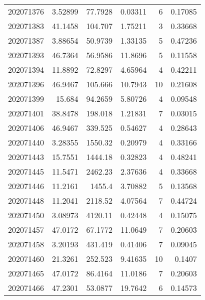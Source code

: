 \begin{tabular}{rrrrrr}
 202071376 &          3.52899 &       77.7928 &            0.03311 &           6 & 0.17085 \\
 202071383 &         41.1458  &      104.707  &            1.75211 &           3 & 0.33668 \\
 202071387 &          3.88654 &       50.9739 &            1.33135 &           5 & 0.47236 \\
 202071393 &         46.7364  &       56.9586 &           11.8696  &           5 & 0.11558 \\
 202071394 &         11.8892  &       72.8297 &            4.65964 &           4 & 0.42211 \\
 202071396 &         46.9467  &      105.666  &           10.7943  &          10 & 0.21608 \\
 202071399 &         15.684   &       94.2659 &            5.80726 &           4 & 0.09548 \\
 202071401 &         38.8478  &      198.018  &            1.21831 &           7 & 0.03015 \\
 202071406 &         46.9467  &      339.525  &            0.54627 &           4 & 0.28643 \\
 202071440 &          3.28355 &     1550.32   &            0.20979 &           4 & 0.33166 \\
 202071443 &         15.7551  &     1444.18   &            0.32823 &           4 & 0.48241 \\
 202071445 &         11.5471  &     2462.23   &            2.37636 &           4 & 0.33668 \\
 202071446 &         11.2161  &     1455.4    &            3.70882 &           5 & 0.13568 \\
 202071448 &         11.2041  &     2118.52   &            4.07564 &           7 & 0.44724 \\
 202071450 &          3.08973 &     4120.11   &            0.42448 &           4 & 0.15075 \\
 202071457 &         47.0172  &       67.1772 &           11.0649  &           7 & 0.20603 \\
 202071458 &          3.20193 &      431.419  &            0.41406 &           7 & 0.09045 \\
 202071460 &         21.3261  &      252.523  &            9.41635 &          10 & 0.1407  \\
 202071465 &         47.0172  &       86.4164 &           11.0186  &           7 & 0.20603 \\
 202071466 &         47.2301  &       53.0877 &           19.7642  &           6 & 0.14573 \\

\end{tabular}
